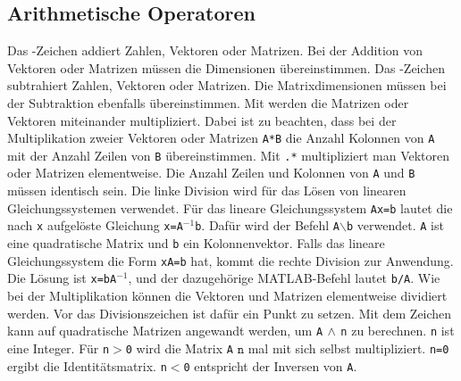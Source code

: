 {\subsection{Arithmetische Operatoren}
Das \boxed{\textbf{\texttt{+}}}-Zeichen addiert Zahlen, Vektoren oder Matrizen. Bei der Addition von Vektoren oder Matrizen müssen die Dimensionen übereinstimmen. 
\newline\newline
Das \boxed{\textbf{\texttt{-}}}-Zeichen subtrahiert Zahlen, Vektoren oder Matrizen. Die Matrixdimensionen müssen bei der Subtraktion ebenfalls übereinstimmen.  
\newline\newline
Mit \boxed{\textbf{\texttt{*}}} werden die Matrizen oder Vektoren miteinander multipliziert. Dabei ist zu beachten, dass bei der Multiplikation zweier Vektoren oder Matrizen \texttt{A*B} die Anzahl Kolonnen von \texttt{A} mit der Anzahl Zeilen von \texttt{B} übereinstimmen. Mit {\color{red}\texttt{.*}} multipliziert man Vektoren oder Matrizen elementweise. Die Anzahl Zeilen und Kolonnen von \texttt{A} und \texttt{B} müssen identisch sein.
\newline\newline
Die linke Division \boxed{\textbf{\texttt{$\backslash$}}} wird für das Lösen von linearen Gleichungssystemen verwendet. Für das lineare Gleichungssystem \texttt{Ax=b} lautet die nach \texttt{x} aufgelöste Gleichung \texttt{x=A$^{-1}$b}. Dafür wird der Befehl \texttt{A$\backslash$b} verwendet. \texttt{A} ist eine quadratische Matrix und \texttt{b} ein Kolonnenvektor.
\newline\newline
Falls das lineare Gleichungssystem die Form \texttt{xA=b} hat, kommt die rechte Division \boxed{\textbf{\texttt{/}}} zur Anwendung. Die Lösung ist \texttt{x=bA$^{-1}$}, und der dazugehörige MATLAB-Befehl lautet \texttt{b/A}. Wie bei der Multiplikation können die Vektoren und Matrizen elementweise dividiert werden. Vor das Divisionszeichen ist dafür ein Punkt zu setzen.
\newline\newline
Mit dem Zeichen \boxed{\textbf{\texttt{\^}}} kann auf quadratische Matrizen angewandt werden, um \texttt{A$\,\wedge\,$n} zu berechnen. \texttt{n} ist eine Integer. Für \texttt{n$>$0} wird die Matrix \texttt{A} $\texttt{n}$ mal mit sich selbst multipliziert. \texttt{n=0} ergibt die Identitätsmatrix. \texttt{n$<$0} entspricht der Inversen von \texttt{A}.
}
